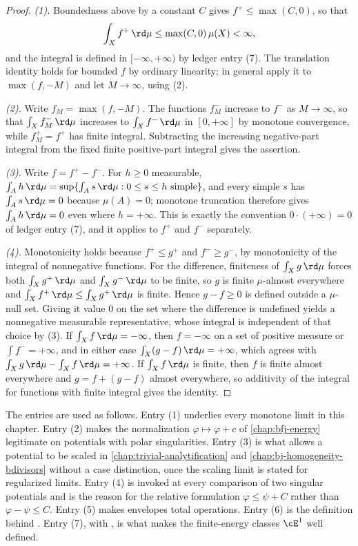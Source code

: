 \begin{proof}
\emph{(1).}  Boundedness above by a constant $C$ gives
$f^+\leq\max(C,0)$, so that
\[
 \int_Xf^+\,\rd\mu\leq\max(C,0)\,\mu(X)<\infty,
\]
and the integral is defined in $[-\infty,+\infty)$ by ledger entry (7).  The
translation identity holds for bounded $f$ by ordinary linearity; in general
apply it to $\max(f,-M)$ and let $M\to\infty$, using (2).

\emph{(2).}  Write $f_M=\max(f,-M)$.  The functions $f_M^-$ increase to
$f^-$ as $M\to\infty$, so that $\int_Xf_M^-\,\rd\mu$ increases to
$\int_Xf^-\,\rd\mu$ in $[0,+\infty]$ by monotone convergence, while
$f_M^+=f^+$ has finite integral.  Subtracting the increasing negative-part
integral from the fixed finite positive-part integral gives the assertion.

\emph{(3).}  Write $f=f^+-f^-$.  For $h\geq0$ measurable,
$\int_Ah\,\rd\mu=\sup\{\int_A s\,\rd\mu: 0\leq s\leq h\ \text{simple}\}$, and
every simple $s$ has $\int_As\,\rd\mu=0$ because $\mu(A)=0$; monotone
truncation therefore gives $\int_Ah\,\rd\mu=0$ even where $h=+\infty$.  This
is exactly the convention $0\cdot(+\infty)=0$ of ledger entry (7), and it
applies to $f^+$ and $f^-$ separately.

\emph{(4).}  Monotonicity holds because $f^+\leq g^+$ and $f^-\geq g^-$,
by monotonicity of the integral of nonnegative functions.  For the difference,
finiteness of $\int_Xg\,\rd\mu$ forces both $\int_Xg^+\,\rd\mu$ and
$\int_Xg^-\,\rd\mu$ to be finite, so $g$ is finite $\mu$-almost everywhere and
$\int_Xf^+\,\rd\mu\leq\int_Xg^+\,\rd\mu$ is finite.  Hence $g-f\geq0$ is
defined outside a $\mu$-null set.  Giving it value $0$ on the set where the
difference is undefined yields a nonnegative measurable representative,
whose integral is independent of that choice by (3).
If $\int_Xf\,\rd\mu=-\infty$, then $f=-\infty$ on a set of positive measure or
$\int f^-=+\infty$, and in either case $\int_X(g-f)\,\rd\mu=+\infty$, which
agrees with $\int_Xg\,\rd\mu-\int_Xf\,\rd\mu=+\infty$.  If
$\int_Xf\,\rd\mu$ is finite, then $f$ is finite almost everywhere and
$g=f+(g-f)$ almost everywhere, so additivity of the integral for functions
with finite integral gives the identity.
\end{proof}

\begin{remark}
\label{rem:ledger-uses}
The entries are used as follows.  Entry (1) underlies every monotone limit
in this chapter.  Entry (2) makes the normalization
$\varphi\mapsto\varphi+c$ of \cref{chap:bfj-energy} legitimate on potentials
with polar singularities.  Entry (3) is what allows a potential to be scaled
in \cref{chap:trivial-analytification} and \cref{chap:bj-homogeneity-bdivisors}
without a case distinction, once the scaling limit is stated for regularized
limits.  Entry (4) is invoked at every comparison of two singular potentials
and is the reason for the relative formulation
$\varphi\leq\psi+C$ rather than $\varphi-\psi\leq C$.  Entry (5) makes
envelopes total operations.  Entry (6) is the definition behind
.  Entry (7), with
, is what makes the finite-energy classes
$\cE^1$ well defined.
\end{remark}


